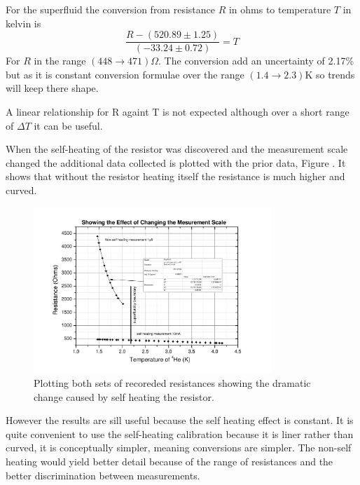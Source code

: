 For the superfluid the conversion from resistance $R$ in ohms to
temperature $T$ in kelvin is
\begin{equation}
\frac{R - (520.89\pm1.25)}{(-33.24\pm0.72)} = T
\end{equation}
For $R$ in the range $(448 \to 471)\Omega$.
The conversion add an uncertainty of 2.17\% but as it is constant conversion
formulae over the range $(1.4 \to 2.3)$K so trends will keep there shape. 

A linear relationship for R againt T is not expected
although over a short range of $\Delta T$ it can be useful.

When the self-heating of the resistor was discovered and the measurement scale changed
the additional data collected is plotted with the prior data, Figure \label{fig:calibrationselfheating}.
It shows that without the resistor heating itself the resistance is much higher and curved.


\begin{figure}[htbp]
\centering
\includegraphics[width = 0.8\textwidth]{pics/calibrationselfheating2.pdf}
\caption{Plotting both sets of recoreded resistances showing the dramatic change
caused by self heating the resistor.\label{fig:calibrationselfheating}}
\end{figure}

However the results are sill useful because the self heating effect is constant.
It is quite convenient to use the self-heating
calibration because it is liner rather than curved, it
is conceptually simpler, meaning conversions are simpler.
The non-self heating would yield better detail because of the range of resistances
and the better discrimination between measurements.






